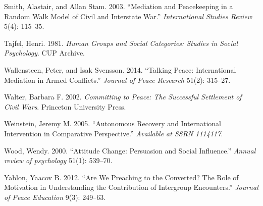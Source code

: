 \documentclass[11pt]{article}
\begin{document}
\hypertarget{ref-smith2003mediation}{}
Smith, Alastair, and Allan Stam. 2003. ``Mediation and Peacekeeping in a
Random Walk Model of Civil and Interstate War.'' \emph{International
Studies Review} 5(4): 115--35.

\hypertarget{ref-tajfel1981groups}{}
Tajfel, Henri. 1981. \emph{Human Groups and Social Categories: Studies
in Social Psychology}. CUP Archive.

\hypertarget{ref-wallensteen2014talking}{}
Wallensteen, Peter, and Isak Svensson. 2014. ``Talking Peace:
International Mediation in Armed Conflicts.'' \emph{Journal of Peace
Research} 51(2): 315--27.

\hypertarget{ref-walter2002committing}{}
Walter, Barbara F. 2002. \emph{Committing to Peace: The Successful
Settlement of Civil Wars}. Princeton University Press.

\hypertarget{ref-weinstein2005autonomous}{}
Weinstein, Jeremy M. 2005. ``Autonomous Recovery and International
Intervention in Comparative Perspective.'' \emph{Available at SSRN
1114117}.

\hypertarget{ref-wood2000attitude}{}
Wood, Wendy. 2000. ``Attitude Change: Persuasion and Social Influence.''
\emph{Annual review of psychology} 51(1): 539--70.

\hypertarget{ref-yablon2012we}{}
Yablon, Yaacov B. 2012. ``Are We Preaching to the Converted? The Role of
Motivation in Understanding the Contribution of Intergroup Encounters.''
\emph{Journal of Peace Education} 9(3): 249--63.
\end{document}
